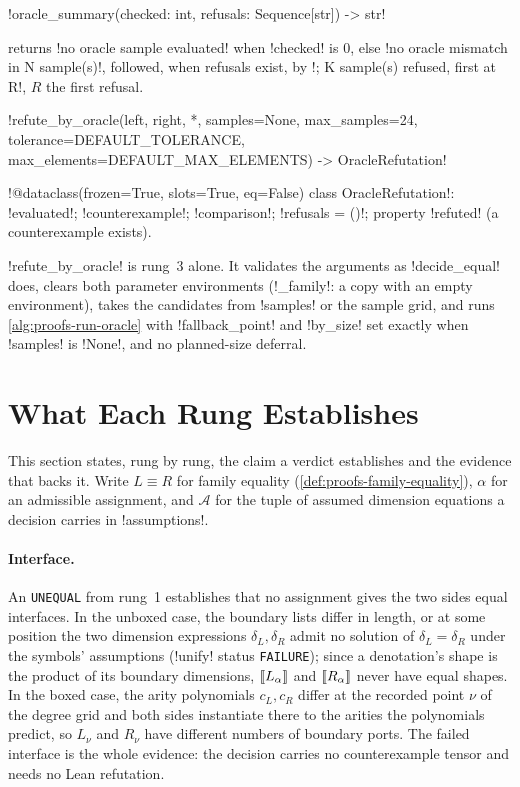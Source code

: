 \begin{signature}
\py!oracle_summary(checked: int, refusals: Sequence[str]) -> str!
\end{signature}
returns \code!no oracle sample evaluated! when \py!checked! is $0$, else \code!no oracle mismatch in N sample(s)!, followed, when refusals exist, by \code!; K sample(s) refused, first at R!, $R$ the first refusal.

\begin{signature}
\py!refute_by_oracle(left, right, *, samples=None, max_samples=24, tolerance=DEFAULT_TOLERANCE, max_elements=DEFAULT_MAX_ELEMENTS) -> OracleRefutation!

\py!@dataclass(frozen=True, slots=True, eq=False) class OracleRefutation!: \py!evaluated!; \py!counterexample!; \py!comparison!; \py!refusals = ()!; property \py!refuted! (a counterexample exists).
\end{signature}

\py!refute_by_oracle! is rung~3 alone. It validates the arguments as \py!decide_equal! does, clears both parameter environments (\py!_family!: a copy with an empty environment), takes the candidates from \py!samples! or the sample grid, and runs \cref{alg:proofs-run-oracle} with \py!fallback_point! and \py!by_size! set exactly when \py!samples! is \py!None!, and no planned-size deferral.

\section{What Each Rung Establishes}\label{sec:proofs-soundness}

This section states, rung by rung, the claim a verdict establishes and the evidence that backs it. Write $L\equiv R$ for family equality (\cref{def:proofs-family-equality}), $\alpha$ for an admissible assignment, and $\mathcal{A}$ for the tuple of assumed dimension equations a decision carries in \py!assumptions!.

\paragraph{Interface.} An \texttt{UNEQUAL} from rung~1 establishes that no assignment gives the two sides equal interfaces. In the unboxed case, the boundary lists differ in length, or at some position the two dimension expressions $\delta_L,\delta_R$ admit no solution of $\delta_L=\delta_R$ under the symbols' assumptions (\py!unify! status \texttt{FAILURE}); since a denotation's shape is the product of its boundary dimensions, $\llbracket L_\alpha \rrbracket$ and $\llbracket R_\alpha \rrbracket$ never have equal shapes. In the boxed case, the arity polynomials $c_L,c_R$ differ at the recorded point $\nu$ of the degree grid and both sides instantiate there to the arities the polynomials predict, so $L_\nu$ and $R_\nu$ have different numbers of boundary ports. The failed interface is the whole evidence: the decision carries no counterexample tensor and needs no Lean refutation.

